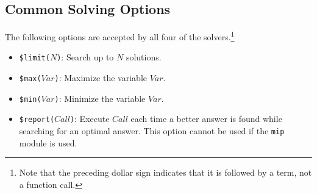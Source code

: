 \subsection{Common Solving Options}
The following options are accepted by all four of the solvers.\footnote{Note that the preceding dollar sign indicates that it is followed by a term, not a function call.}
\begin{itemize}
\item \texttt{\$limit($N$)}: Search up to $N$ solutions.
\item \texttt{\$max($Var$)}: Maximize the variable $Var$.
\item \texttt{\$min($Var$)}: Minimize the variable $Var$.
\item \texttt{\$report($Call$)}: Execute $Call$ each time a better answer is found while searching for an optimal answer. This option cannot be used if the {\tt mip} module is used.
\end{itemize}

